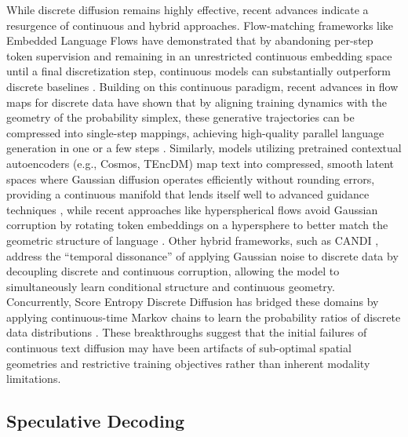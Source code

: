\documentclass[11pt, a4paper, logo, copyright, gdm]{google}
\begin{document}
While discrete diffusion remains highly effective, recent advances indicate a resurgence of continuous and hybrid approaches. Flow-matching frameworks like Embedded Language Flows have demonstrated that by abandoning per-step token supervision and remaining in an unrestricted continuous embedding space until a final discretization step, continuous models can substantially outperform discrete baselines \citep{hu2026elf}. Building on this continuous paradigm, recent advances in flow maps for discrete data have shown that by aligning training dynamics with the geometry of the probability simplex, these generative trajectories can be compressed into single-step mappings, achieving high-quality parallel language generation in one or a few steps \citep{lee2026flowmap, potaptchik2026discrete}. Similarly, models utilizing pretrained contextual autoencoders (e.g., Cosmos, TEncDM) map text into compressed, smooth latent spaces where Gaussian diffusion operates efficiently without rounding errors, providing a continuous manifold that lends itself well to advanced guidance techniques \citep{he2024manifold, meshchaninov2025cosmos, shabalin2025tencdm}, while recent approaches like hyperspherical flows avoid Gaussian corruption by rotating token embeddings on a hypersphere to better match the geometric structure of language \citep{deschenaux2026hyperspherical}. Other hybrid frameworks, such as CANDI \citep{pynadath2025candi}, address the ``temporal dissonance'' of applying Gaussian noise to discrete data by decoupling discrete and continuous corruption, allowing the model to simultaneously learn conditional structure and continuous geometry. Concurrently, Score Entropy Discrete Diffusion has bridged these domains by applying continuous-time Markov chains to learn the probability ratios of discrete data distributions \citep{lou2024discrete}. These breakthroughs suggest that the initial failures of continuous text diffusion may have been artifacts of sub-optimal spatial geometries and restrictive training objectives rather than inherent modality limitations.

\subsection{Speculative Decoding}
\end{document}
